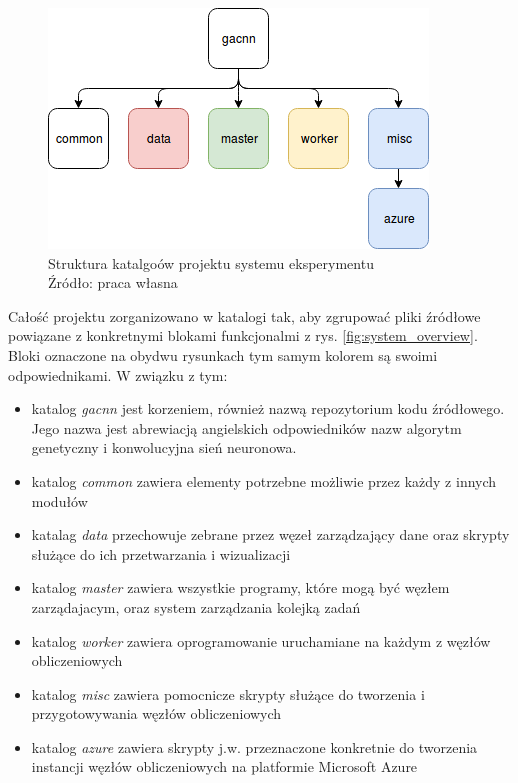 \begin{figure}[h!tb]
	 \centering
	 \includegraphics[width = 0.7\linewidth]{img/folder_structure}
	 \caption{Struktura katalgoów projektu systemu eksperymentu\\
              Źródło: praca własna}
	 \label{fig:folder_structure}
\end{figure}

Całość projektu zorganizowano w katalogi tak, aby zgrupować pliki źródłowe powiązane z konkretnymi blokami funkcjonalmi z rys. \ref{fig:system_overview}.
Bloki oznaczone na obydwu rysunkach tym samym kolorem są swoimi odpowiednikami.
W związku z tym:
\begin{itemize}
  \item katalog \textit{gacnn} jest korzeniem, również nazwą repozytorium kodu źródłowego.
        Jego nazwa jest abrewiacją angielskich odpowiedników nazw algorytm genetyczny i konwolucyjna sień neuronowa.
  \item katalog \textit{common} zawiera elementy potrzebne możliwie przez każdy z innych modułów
  \item katalag \textit{data} przechowuje zebrane przez węzeł zarządzający dane oraz skrypty służące do ich przetwarzania i wizualizacji
  \item katalog \textit{master} zawiera wszystkie programy, które mogą być węzłem zarządajacym, oraz system zarządzania kolejką zadań
  \item katalog \textit{worker} zawiera oprogramowanie uruchamiane na każdym z węzłów obliczeniowych
  \item katalog \textit{misc} zawiera pomocnicze skrypty służące do tworzenia i przygotowywania węzłów obliczeniowych
  \item katalog \textit{azure} zawiera skrypty j.w. przeznaczone konkretnie do tworzenia instancji węzłów obliczeniowych na platformie Microsoft Azure
\end{itemize}

